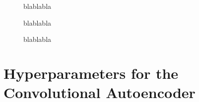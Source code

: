 \begin{center}
	\begin{figure}[htbp!]\ContinuedFloat
		\scalebox{.9}{}
		\scalebox{.9}{}
		\caption{}
	\end{figure}
\end{center}
\begin{center}
	\begin{figure}[htbp!]
		\scalebox{.9}{}
		\scalebox{.9}{}
		\scalebox{.9}{}
		\scalebox{.9}{}
		\scalebox{.9}{}
		\scalebox{.9}{}
		\caption{blablabla}
		\label{Fig:Activations Rare}
	\end{figure}
\end{center}
\begin{center}
	\begin{figure}[htbp!]\ContinuedFloat
		\scalebox{.9}{}
		\scalebox{.9}{}
		\caption{blablabla}
		\label{}
	\end{figure}
\end{center}
\begin{center}
	\begin{figure}[htbp!]
		\scalebox{.9}{}
		\scalebox{.9}{}
		\scalebox{.9}{}
		\caption{blablabla}
		\label{Fig:Activations Rare 2nd3rd}
	\end{figure}
\end{center}
\newpage
\chapter{Hyperparameters for the Convolutional Autoencoder}
\label{Ch:ApB}

